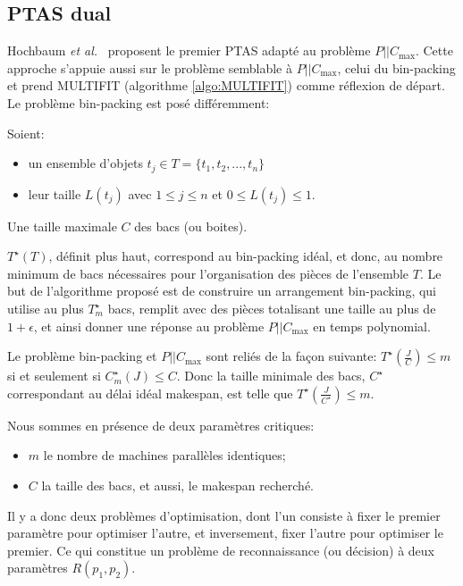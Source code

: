 \documentclass[a4paper,12pt]{report}
\theoremstyle{plain}				%
\theoremstyle{definition}				%
\newcommand\problemGrahamP{$P||C_{\max}$\xspace}
\begin{document}
\subsection{PTAS dual} \label{ssec:approximationPTAS} %

Hochbaum \emph{et al.}\ \cite{hochbaum1987using} proposent le
premier PTAS adapté au problème \problemGrahamP.
Cette approche s'appuie aussi sur le problème semblable à
\problemGrahamP, celui du bin-packing et prend MULTIFIT
(algorithme \ref{algo:MULTIFIT}) comme réflexion de départ.
Le problème bin-packing est posé différemment:

Soient:
\begin{itemize}
\item un ensemble d'objets $t_j \in T = \{t_1, t_2, ..., t_n\}$
\item leur taille $L(t_j)$ avec $1 \le j \le n$ et $0 \le L(t_j) \le 1$.
\end{itemize}
Une taille maximale $C$ des bacs (ou boites).

$T^{\star}(T)$, définit plus haut, correspond au bin-packing idéal, et donc,
au nombre minimum de bacs nécessaires pour l'organisation des pièces
de l'ensemble $T$.
Le but de l'algorithme proposé est de construire un arrangement
bin-packing,
qui utilise au plus $T^{\star}_m$ bacs, remplit
avec des pièces totalisant une taille au plus de $1+ \epsilon$,
et ainsi donner une réponse au problème \problemGrahamP en temps polynomial.

Le problème bin-packing et \problemGrahamP sont reliés de la façon suivante:
$T^{\star}(\frac{J}{C}) \le m$ si et seulement si $C^{\star}_m(J) \le C$.
Donc la taille minimale des bacs, $C^{\star}$ correspondant au délai
idéal makespan, est telle que $T^{\star}(\frac{J}{C^{\star}}) \le m$.

Nous sommes en présence de deux paramètres critiques:
\begin{itemize}
\item $m$ le nombre de machines parallèles identiques;
\item $C$ la taille des bacs, et aussi, le makespan recherché.
\end{itemize}
Il y a donc deux problèmes d'optimisation,
dont l'un consiste à fixer le premier paramètre pour optimiser l'autre,
et inversement, fixer l'autre pour optimiser le premier.
Ce qui constitue un problème de reconnaissance (ou décision) à deux
paramètres $R(p_1, p_2)$.

\bigskip
\end{document}

